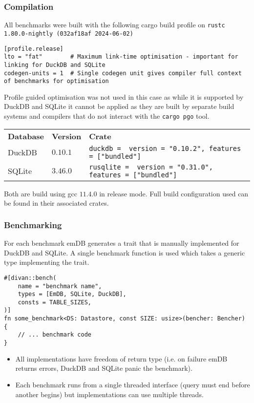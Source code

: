 \subsubsection{Compilation}
All benchmarks were built with the following cargo build profile on \texttt{rustc 1.80.0-nightly (032af18af 2024-06-02)}
\begin{verbatim}
[profile.release]
lto = "fat"        # Maximum link-time optimisation - important for linking for DuckDB and SQLite 
codegen-units = 1  # Single codegen unit gives compiler full context of benchmarks for optimisation
\end{verbatim}
Profile guided optimisation was not used in this case as while it is supported by DuckDB and SQLite it cannot be applied as they are built by separate build systems and compilers that do not interact with the \texttt{cargo pgo}\cite{Cargopgo} tool.
\begin{center}
    \begin{tabular}{l l l }
        \textbf{Database} & \textbf{Version} & \textbf{Crate}                                                               \\
        DuckDB            & $0.10.1$         & \texttt{duckdb = { version = "0.10.2", features = ["bundled"] }}   \\
        SQLite            & $3.46.0$         & \texttt{rusqlite = { version = "0.31.0", features = ["bundled"] }} \\
    \end{tabular}
\end{center}
Both are build using gcc $11.4.0$ in release mode. Full build configuration used can be found in their associated crates.
\subsubsection{Benchmarking}
For each benchmark emDB generates a trait that is manually implemented for DuckDB and SQLite. A single benchmark function is used which takes a generic type implementing the trait.
\begin{verbatim}
#[divan::bench(
    name = "benchmark name",
    types = [EmDB, SQLite, DuckDB],
    consts = TABLE_SIZES,
)]
fn some_benchmark<DS: Datastore, const SIZE: usize>(bencher: Bencher) {
    // ... benchmark code
}
\end{verbatim}
\noindent
\begin{itemize}
    \setlength\itemsep{0em}
    \item All implementations have freedom of return type (i.e. on failure emDB returns errors, DuckDB and SQLite panic the benchmark).
    \item Each benchmark runs from a single threaded interface (query must end before another begins) but implementations can use multiple threads.
\end{itemize} 

